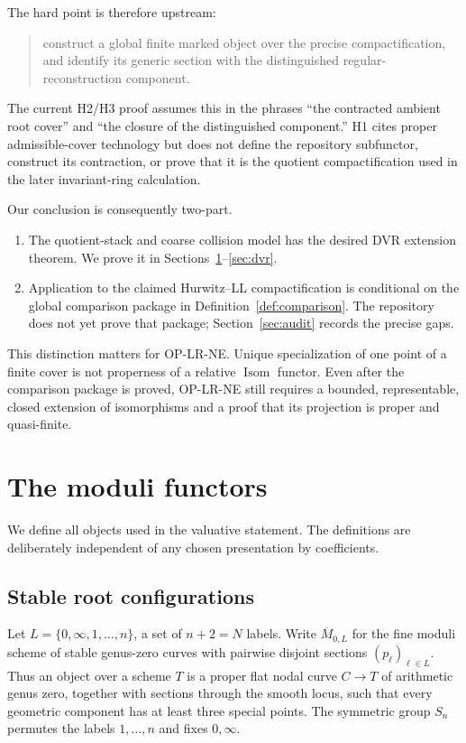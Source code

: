\documentclass[11pt]{article}
\newcommand{\Isom}{\operatorname{Isom}}
\newcommand{\ol}{\overline}
\begin{document}
The hard point is therefore upstream:
\begin{quote}
construct a global finite marked object over the precise compactification,
and identify its generic section with the distinguished
regular-reconstruction component.
\end{quote}
The current H2/H3 proof assumes this in the phrases ``the contracted ambient
root cover'' and ``the closure of the distinguished component.''  H1 cites
proper admissible-cover technology but does not define the repository
subfunctor, construct its contraction, or prove that it is the quotient
compactification used in the later invariant-ring calculation.

Our conclusion is consequently two-part.
\begin{enumerate}
\item The quotient-stack and coarse collision model has the desired DVR
extension theorem.  We prove it in Sections~\ref{sec:functors}--\ref{sec:dvr}.
\item Application to the claimed Hurwitz--LL compactification is conditional
on the global comparison package in Definition~\ref{def:comparison}.  The
repository does not yet prove that package; Section~\ref{sec:audit} records
the precise gaps.
\end{enumerate}

This distinction matters for OP-LR-NE.  Unique specialization of one point
of a finite cover is not properness of a relative $\Isom$ functor.  Even
after the comparison package is proved, OP-LR-NE still requires a bounded,
representable, closed extension of isomorphisms and a proof that its
projection is proper and quasi-finite.

\section{The moduli functors}\label{sec:functors}

We define all objects used in the valuative statement.  The definitions are
deliberately independent of any chosen presentation by coefficients.

\subsection{Stable root configurations}

Let $L=\{0,\infty,1,\ldots,n\}$, a set of $n+2=N$ labels.  Write
$\ol M_{0,L}$ for the fine moduli scheme of stable genus-zero curves with
pairwise disjoint sections $(p_\ell)_{\ell\in L}$.  Thus an object over a
scheme $T$ is a proper flat nodal curve $C\to T$ of arithmetic genus zero,
together with sections through the smooth locus, such that every geometric
component has at least three special points.  The symmetric group $S_n$
permutes the labels $1,\ldots,n$ and fixes $0,\infty$.
\end{document}
